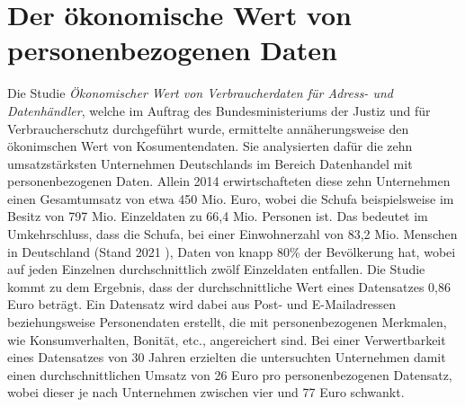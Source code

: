 \section{Der ökonomische Wert von personenbezogenen Daten}

Die Studie \textit{Ökonomischer Wert von Verbraucherdaten für Adress- und Datenhändler}, welche im Auftrag des Bundesministeriums der Justiz und für Verbraucherschutz durchgeführt wurde, ermittelte annäherungsweise den ökonimschen Wert von Kosumentendaten. Sie analysierten dafür die zehn umsatzstärksten Unternehmen Deutschlands im Bereich Datenhandel mit personenbezogenen Daten. Allein 2014 erwirtschafteten diese zehn Unternehmen einen Gesamtumsatz von etwa 450 Mio. Euro, wobei die Schufa beispielsweise im Besitz von 797 Mio. Einzeldaten zu 66,4 Mio. Personen ist. Das bedeutet im Umkehrschluss, dass die Schufa, bei einer Einwohnerzahl von 83,2 Mio. Menschen in Deutschland (Stand 2021 \cite{einwohnerzahl_2021}), Daten von knapp 80\% der Bevölkerung hat, wobei auf jeden Einzelnen durchschnittlich zwölf Einzeldaten entfallen. Die Studie kommt zu dem Ergebnis, dass der durchschnittliche Wert eines Datensatzes 0,86 Euro beträgt. Ein Datensatz wird dabei aus Post- und E-Mailadressen beziehungsweise Personendaten erstellt, die mit personenbezogenen Merkmalen, wie Konsumverhalten, Bonität, etc., angereichert sind. Bei einer Verwertbarkeit eines Datensatzes von 30 Jahren erzielten die untersuchten Unternehmen damit einen durchschnittlichen Umsatz von 26 Euro pro personenbezogenen Datensatz, wobei dieser je nach Unternehmen zwischen vier und 77 Euro schwankt. \cite{Wert_der_Daten_2017}